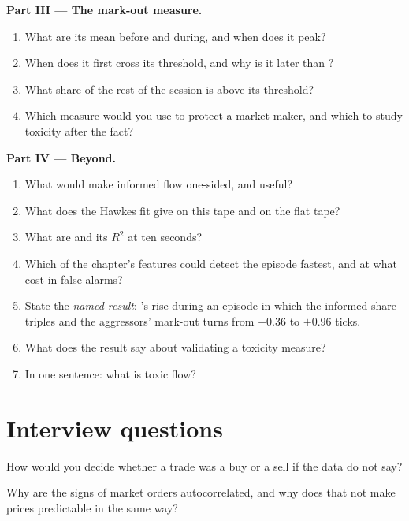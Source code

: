 \begin{problem}
\medskip\noindent\textbf{Part III --- The mark-out measure.}
\begin{enumerate}[resume]
\item What are its mean before and during, and when does it peak?
\item When does it first cross its threshold, and why is it later than ?
\item What share of the rest of the session is above its threshold?
\item Which measure would you use to protect a market maker, and which to study toxicity after the fact?
\end{enumerate}

\medskip\noindent\textbf{Part IV --- Beyond.}
\begin{enumerate}[resume]
\item What would make informed flow one-sided, and  useful?
\item What does the Hawkes fit give on this tape and on the flat tape?
\item What are  and its $R^2$ at ten seconds?
\item Which of the chapter's features could detect the episode fastest, and at what cost in false alarms?
\item State the \emph{named result}: 's rise during an episode in which the informed share triples and the aggressors' mark-out turns
from $-0.36$ to $+0.96$ ticks.
\item What does the result say about validating a toxicity measure?
\item In one sentence: what is toxic flow?
\end{enumerate}
\end{problem}

\section{Interview questions}

\begin{interviewq}\label{iq:rs:trade-flow-features:1}
How would you decide whether a trade was a buy or a sell if the data do not say?
\end{interviewq}

\begin{interviewq}\label{iq:rs:trade-flow-features:2}
Why are the signs of market orders autocorrelated, and why does that not make prices predictable in the same way?
\end{interviewq}

